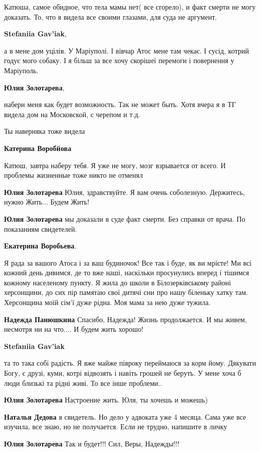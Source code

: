 \begin{itemize}
Катюша, самое обидное, что тела мамы нет( все сгорело), и факт смерти не могу
доказать. То, что я видела все своими глазами, для суда не аргумент.

\textbf{Stefaniia Gav'iak}, 

а в мене дом уцілів. У Маріуполі. І вівчар Атос мене там чекає. І сусід, котрий
годує мого собаку. І я більш за все хочу скорішеї перемоги і повернення у
Маріуполь.

\textbf{Юлия Золотарева}, 

набери меня как будет возможность. Так не может быть. Хотя вчера я в ТГ видела
дом на Московской, с черепом и т.д.


Ты наверняка тоже видела

\textbf{Катерина Воробйова} 

Катюш, завтра наберу тебя. Я уже не могу, мозг взрывается от всего. И проблемы жизненные тоже никто не отменял

\textbf{Юлия Золотарева} Юлия, здравствуйте. Я вам очень соболезную. Держитесь, нужно Жить... Будем Жить!

\textbf{Юлия Золотарева} мы доказали в суде факт смерти. Без справки от врача. По показаниям свидетелей.

\textbf{Екатерина Воробьева}. 

Я рада за вашого Атоса і за ваш будиночок! Все так і буде, як ви мрієте! Ми всі
кожний день дивимся, де то вже наші, наскільки просунулись вперед і тішимся
кожному населеному пункту. Я жила до школи в Білозерківському районі
херсонщини, до сих пір памятаю свої дитячі сни про нашу біленьку хатку там.
Херсонщина моїй сім'ї дуже рідна. Моя мама за нею дуже тужила.

\textbf{Надежда Панюшкина} Спасибо, Надежда! Жизнь продолжается. И мы живем, несмотря ни на что.... И будем жить хорошо!

\textbf{Stefaniia Gav'iak} 

та то така собі радість. Я вже майже півроку переймаюся за корм йому. Дякувати
Богу, є друзі, куми, котрі відвозять і навіть грошей не беруть. У мене хоча б
люди близькі та рідні живі. То все інше проблеми..

\textbf{Юлия Золотарева} Настроение жить. Юля, ты хочешь и можешь)

\textbf{Наталья Дедова} я свидетель. Но дело у адвоката уже 4 месяца. Сама уже все изучила, все знаю, но не получается. Если не трудно, напишите в личку

\textbf{Юлия Золотарева} Так и будет!!! Сил, Веры, Надежды!!!

\end{itemize} %

